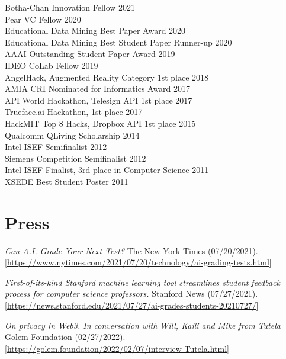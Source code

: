 \documentclass[margin, 10pt]{res} %
\begin{document}
\begin{resume}
Botha-Chan Innovation Fellow \hfill 2021 \\
Pear VC Fellow \hfill 2020 \\
Educational Data Mining Best Paper Award \hfill 2020 \\
Educational Data Mining Best Student Paper Runner-up \hfill 2020 \\
AAAI Outstanding Student Paper Award \hfill 2019 \\
IDEO CoLab Fellow \hfill 2019 \\
AngelHack, Augmented Reality Category 1st place \hfill 2018 \\
AMIA CRI Nominated for Informatics Award \hfill 2017 \\
API World Hackathon, Telesign API 1st place \hfill 2017 \\
Trueface.ai Hackathon, 1st place \hfill 2017 \\
HackMIT Top 8 Hacks, Dropbox API 1st place \hfill 2015 \\
Qualcomm QLiving Scholarship \hfill 2014 \\
Intel ISEF Semifinalist \hfill 2012 \\
Siemens Competition Semifinalist \hfill 2012 \\
Intel ISEF Finalist, 3rd place in Computer Science \hfill 2011 \\
XSEDE Best Student Poster \hfill 2011 \\


\section{Press}

\textit{Can A.I. Grade Your Next Test?} The New York Times (07/20/2021). [\url{https://www.nytimes.com/2021/07/20/technology/ai-grading-tests.html}]

\textit{First-of-its-kind Stanford machine learning tool streamlines student feedback process for computer science professors.} Stanford News (07/27/2021). [\url{https://news.stanford.edu/2021/07/27/ai-grades-students-20210727/}]

\textit{On privacy in Web3. In conversation with Will, Kaili and Mike from Tutela} Golem Foundation (02/27/2022). [\url{https://golem.foundation/2022/02/07/interview-Tutela.html}]


\end{resume}
\end{document}
